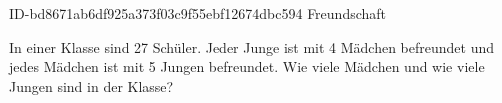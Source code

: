 \begin{exercise}
      {ID-bd8671ab6df925a373f03c9f55ebf12674dbc594}
      {Freundschaft}
  \ifproblem\problem\par
    In einer Klasse sind 27 Schüler. Jeder Junge ist mit 4 Mädchen befreundet
    und jedes Mädchen ist mit 5 Jungen befreundet. Wie viele Mädchen und wie
    viele Jungen sind in der Klasse?
  \fi
\end{exercise}
